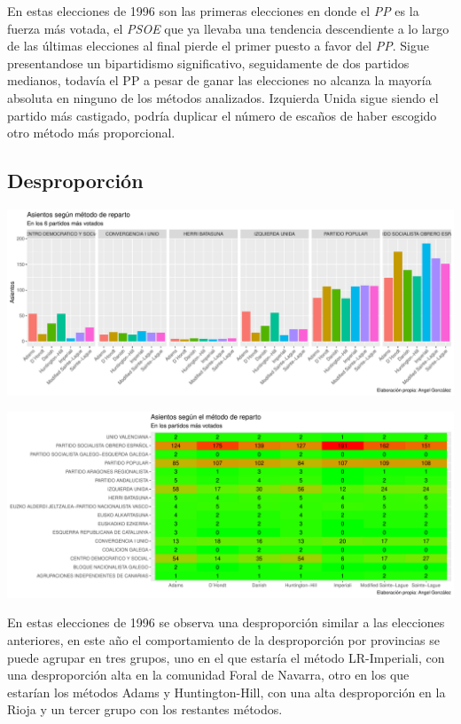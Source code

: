 \documentclass[12pt,a4paper,]{book}
\numberwithin{dummy}{section}
\theoremstyle{ocrenumbox}
\theoremstyle{blacknumex}
\theoremstyle{blacknumbox}
\theoremstyle{ocrenum}
\theoremstyle{ocrenum}
\begin{document}
En estas elecciones de 1996 son las primeras elecciones en donde el
\emph{PP} es la fuerza más votada, el \emph{PSOE} que ya llevaba una
tendencia descendiente a lo largo de las últimas elecciones al final
pierde el primer puesto a favor del \emph{PP}. Sigue presentandose un
bipartidismo significativo, seguidamente de dos partidos medianos,
todavía el PP a pesar de ganar las elecciones no alcanza la mayoría
absoluta en ninguno de los métodos analizados. Izquierda Unida sigue
siendo el partido más castigado, podría duplicar el número de escaños de
haber escogido otro método más proporcional.

\hypertarget{desproporciuxf3n-6}{%
\subsection{Desproporción}\label{desproporciuxf3n-6}}

\begin{center}\includegraphics[width=1\linewidth]{figurasR/unnamed-chunk-95-1} \end{center}

\begin{center}\includegraphics[width=1\linewidth]{figurasR/unnamed-chunk-95-2} \end{center}

En estas elecciones de 1996 se observa una desproporción similar a las
elecciones anteriores, en este año el comportamiento de la desproporción
por provincias se puede agrupar en tres grupos, uno en el que estaría el
método LR-Imperiali, con una desproporción alta en la comunidad Foral de
Navarra, otro en los que estarían los métodos Adams y Huntington-Hill,
con una alta desproporción en la Rioja y un tercer grupo con los
restantes métodos.
\end{document}
